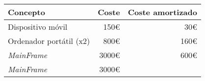 \begin{longtable}[]{@{}lrr@{}}
	\toprule
	\begin{minipage}[b]{0.29\columnwidth}\raggedright\strut
		\textbf{Concepto}\strut
	\end{minipage} & \begin{minipage}[b]{0.18\columnwidth}\raggedright\strut
		\textbf{Coste}\strut
	\end{minipage} & \begin{minipage}[b]{0.32\columnwidth}\raggedright\strut
		\textbf{Coste amortizado}\strut
	\end{minipage}\tabularnewline
	\midrule
	\endhead
	\begin{minipage}[t]{0.29\columnwidth}\raggedright\strut
		Dispositivo móvil\strut
	\end{minipage} & \begin{minipage}[t]{0.18\columnwidth}\raggedright\strut
		150\euro{}\strut
	\end{minipage} & \begin{minipage}[t]{0.32\columnwidth}\raggedright\strut
		30\euro{}\strut
	\end{minipage}\tabularnewline
	\begin{minipage}[t]{0.29\columnwidth}\raggedright\strut
		Ordenador portátil (x2)\strut
	\end{minipage} & \begin{minipage}[t]{0.18\columnwidth}\raggedright\strut
		800\euro{}\strut
	\end{minipage} & \begin{minipage}[t]{0.32\columnwidth}\raggedright\strut
		160\euro{}\strut
	\end{minipage}\tabularnewline
	\begin{minipage}[t]{0.29\columnwidth}\raggedright\strut
		\textit{MainFrame}\strut
	\end{minipage} & \begin{minipage}[t]{0.18\columnwidth}\raggedright\strut
		3000\euro{}\strut
	\end{minipage} & \begin{minipage}[t]{0.32\columnwidth}\raggedright\strut
		600\euro{}\strut
	\end{minipage}\tabularnewline
	\begin{minipage}[t]{0.29\columnwidth}\raggedright\strut
		\textit{MainFrame}\strut
	\end{minipage} & \begin{minipage}[t]{0.18\columnwidth}\raggedright\strut
		3000\euro{}\strut
	\end{minipage} & \begin{minipage}[t]{0.32\columnwidth}\raggedright\strut

\end{minipage}
\end{longtable}

